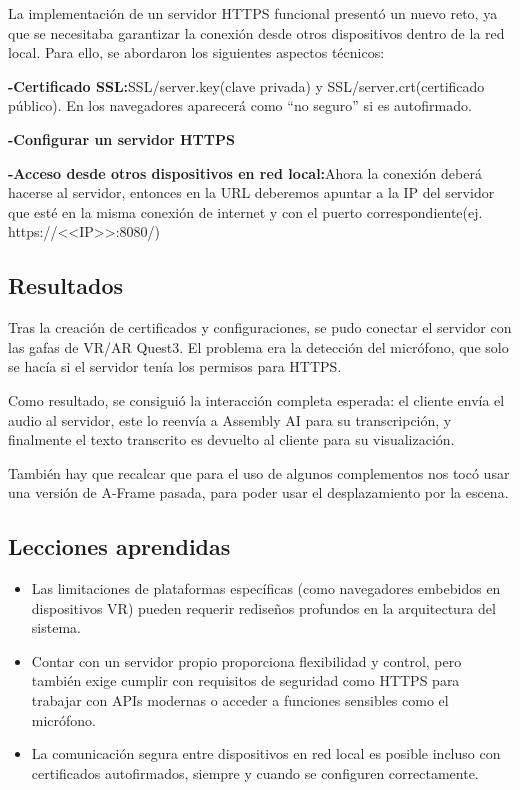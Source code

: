 \documentclass[a4paper, 12pt]{book}
\begin{document}
La implementación de un servidor HTTPS funcional presentó un nuevo reto, ya que se necesitaba garantizar la conexión desde otros dispositivos dentro de la red local. Para ello, se abordaron los siguientes aspectos técnicos:

\textbf{-Certificado SSL:}SSL/server.key(clave privada) y SSL/server.crt(certificado público). En los navegadores aparecerá como “no seguro” si es autofirmado.

\textbf{-Configurar un servidor HTTPS} 

\textbf{-Acceso desde otros dispositivos en red local:}Ahora la conexión deberá hacerse al servidor, entonces en la URL deberemos apuntar a la IP del servidor que esté en la misma conexión de internet y con el puerto correspondiente(ej. https://<<IP>>:8080/)

\subsection{Resultados}
Tras la creación de certificados y configuraciones, se pudo conectar el servidor con las gafas de VR/AR Quest3. El problema era la detección del micrófono, que solo se hacía si el servidor tenía los permisos para HTTPS.

Como resultado, se consiguió la interacción completa esperada: el cliente envía el audio al servidor, este lo reenvía a Assembly AI para su transcripción, y finalmente el texto transcrito es devuelto al cliente para su visualización.

También hay que recalcar que para el uso de algunos complementos nos tocó usar una versión de A-Frame pasada, para poder usar el desplazamiento por la escena.
\subsection{Lecciones aprendidas}
\begin{itemize}
 \item Las limitaciones de plataformas específicas (como navegadores embebidos en dispositivos VR) pueden requerir rediseños profundos en la arquitectura del sistema.
 \item Contar con un servidor propio proporciona flexibilidad y control, pero también exige cumplir con requisitos de seguridad como HTTPS para trabajar con APIs modernas o acceder a funciones sensibles como el micrófono.
 \item La comunicación segura entre dispositivos en red local es posible incluso con certificados autofirmados, siempre y cuando se configuren correctamente.
\end{itemize}
\end{document}
